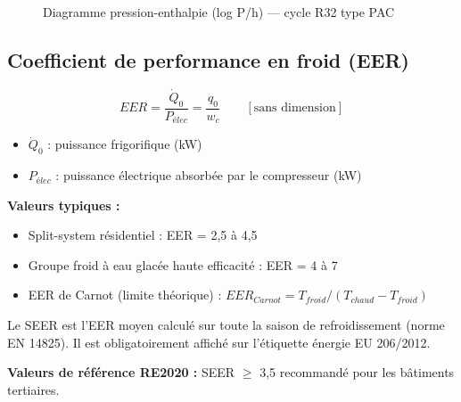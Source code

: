 \begin{figure}[H]
  \caption{Diagramme pression-enthalpie (log P/h) — cycle R32 type PAC}
  \label{fig:diag_ph_r32}
\end{figure}

\subsection{Coefficient de performance en froid (EER)}

\begin{definition}[title=EER — Energy Efficiency Ratio]
\begin{equation}
  EER = \frac{\dot{Q}_0}{P_{élec}} = \frac{q_0}{w_c} \qquad \left[\text{sans dimension}\right]
  \label{eq:eer}
\end{equation}
\begin{itemize}
  \item $\dot{Q}_0$ : puissance frigorifique (\si{\kilo\watt})
  \item $P_{élec}$ : puissance électrique absorbée par le compresseur (\si{\kilo\watt})
\end{itemize}

\textbf{Valeurs typiques :}
\begin{itemize}
  \item Split-system résidentiel : EER = 2,5 à 4,5
  \item Groupe froid à eau glacée haute efficacité : EER = 4 à 7
  \item EER de Carnot (limite théorique) : $EER_{Carnot} = T_{froid}/(T_{chaud}-T_{froid})$
\end{itemize}
\end{definition}

\begin{definition}[title=SEER — Seasonal EER]
Le SEER est l'EER moyen calculé sur toute la saison de refroidissement (norme EN 14825). Il est obligatoirement affiché sur l'étiquette énergie EU 206/2012.

\textbf{Valeurs de référence RE2020 :} SEER $\geq$ 3,5 recommandé pour les bâtiments tertiaires.
\end{definition}

